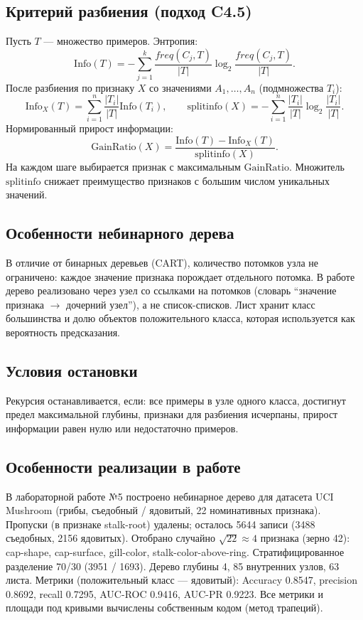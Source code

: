 \documentclass[12pt,a4paper]{article}
\begin{document}
\subsection{Критерий разбиения (подход C4.5)}
Пусть $T$ --- множество примеров. Энтропия:
\begin{equation}
\mathrm{Info}(T) = -\sum_{j=1}^{k} \frac{freq(C_j,T)}{|T|} \log_2 \frac{freq(C_j,T)}{|T|}.
\end{equation}
После разбиения по признаку $X$ со значениями $A_1,\dots,A_n$ (подмножества $T_i$):
\begin{equation}
\mathrm{Info}_X(T) = \sum_{i=1}^{n} \frac{|T_i|}{|T|} \mathrm{Info}(T_i), \qquad
\mathrm{splitinfo}(X) = -\sum_{i=1}^{n} \frac{|T_i|}{|T|} \log_2 \frac{|T_i|}{|T|}.
\end{equation}
Нормированный прирост информации:
\begin{equation}
\mathrm{GainRatio}(X) = \frac{\mathrm{Info}(T) - \mathrm{Info}_X(T)}{\mathrm{splitinfo}(X)}.
\end{equation}
На каждом шаге выбирается признак с максимальным $\mathrm{GainRatio}$. Множитель $\mathrm{splitinfo}$ снижает преимущество признаков с большим числом уникальных значений.

\subsection{Особенности небинарного дерева}
В отличие от бинарных деревьев (CART), количество потомков узла не ограничено: каждое значение признака порождает отдельного потомка. В работе дерево реализовано через узел со ссылками на потомков (словарь ``значение признака $\rightarrow$ дочерний узел''), а не список-списков. Лист хранит класс большинства и долю объектов положительного класса, которая используется как вероятность предсказания.

\subsection{Условия остановки}
Рекурсия останавливается, если: все примеры в узле одного класса, достигнут предел максимальной глубины, признаки для разбиения исчерпаны, прирост информации равен нулю или недостаточно примеров.

\subsection{Особенности реализации в работе}
В лабораторной работе №5 построено небинарное дерево для датасета UCI Mushroom (грибы, съедобный / ядовитый, 22 номинативных признака). Пропуски (в признаке stalk-root) удалены; осталось 5644 записи (3488 съедобных, 2156 ядовитых). Отобрано случайно $\sqrt{22} \approx 4$ признака (зерно 42): cap-shape, cap-surface, gill-color, stalk-color-above-ring. Стратифицированное разделение 70/30 (3951 / 1693). Дерево глубины 4, 85 внутренних узлов, 63 листа. Метрики (положительный класс --- ядовитый): Accuracy 0.8547, precision 0.8692, recall 0.7295, AUC-ROC 0.9416, AUC-PR 0.9223. Все метрики и площади под кривыми вычислены собственным кодом (метод трапеций).
\end{document}
